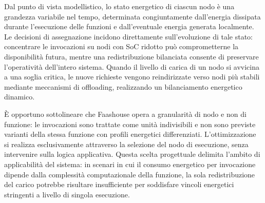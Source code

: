 Dal punto di vista modellistico, lo stato energetico di ciascun nodo è
una grandezza variabile nel tempo, determinata congiuntamente
dall'energia dissipata durante l'esecuzione delle funzioni e
dall'eventuale energia generata localmente. Le decisioni di assegnazione
incidono direttamente sull'evoluzione di tale stato: concentrare le
invocazioni su nodi con SoC ridotto può comprometterne la disponibilità
futura, mentre una redistribuzione bilanciata consente di preservare
l'operatività dell'intero sistema. Quando il livello di carica di un
nodo si avvicina a una soglia critica, le nuove richieste vengono
reindirizzate verso nodi più stabili mediante meccanismi di offloading,
realizzando un bilanciamento energetico dinamico.

È opportuno sottolineare che Faashouse opera a granularità di nodo e
non di funzione: le invocazioni sono trattate come unità indivisibili e
non sono previste varianti della stessa funzione con profili energetici
differenziati. L'ottimizzazione si realizza esclusivamente attraverso
la selezione del nodo di esecuzione, senza intervenire sulla logica
applicativa. Questa scelta progettuale delimita l'ambito di applicabilità
del sistema: in scenari in cui il consumo energetico per invocazione
dipende dalla complessità computazionale della funzione, la sola
redistribuzione del carico potrebbe risultare insufficiente per
soddisfare vincoli energetici stringenti a livello di singola esecuzione.